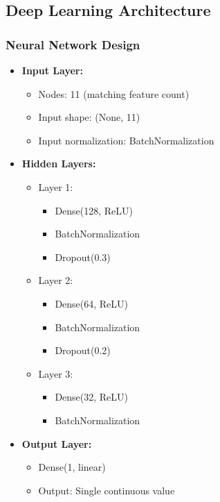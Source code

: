 \documentclass[12pt,a4paper]{report}
\begin{document}
\subsection{Deep Learning Architecture}
\subsubsection{Neural Network Design}
\begin{itemize}
    \item \textbf{Input Layer:}
    \begin{itemize}
        \item Nodes: 11 (matching feature count)
        \item Input shape: (None, 11)
        \item Input normalization: BatchNormalization
    \end{itemize}
    
    \item \textbf{Hidden Layers:}
    \begin{itemize}
        \item Layer 1:
        \begin{itemize}
            \item Dense(128, ReLU)
            \item BatchNormalization
            \item Dropout(0.3)
        \end{itemize}
        \item Layer 2:
        \begin{itemize}
            \item Dense(64, ReLU)
            \item BatchNormalization
            \item Dropout(0.2)
        \end{itemize}
        \item Layer 3:
        \begin{itemize}
            \item Dense(32, ReLU)
            \item BatchNormalization
        \end{itemize}
    \end{itemize}
    
    \item \textbf{Output Layer:}
    \begin{itemize}
        \item Dense(1, linear)
        \item Output: Single continuous value
    \end{itemize}
\end{itemize}
\end{document}
